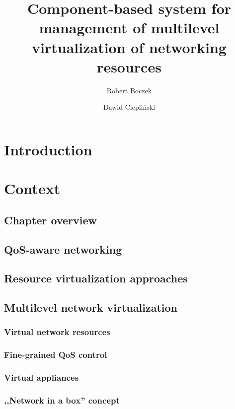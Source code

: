 \documentclass[11pt]{book}
\title{Component-based system for management of multilevel virtualization of networking resources}
\author{Robert Boczek \and Dawid Ciepliński}
\begin{document}
  \maketitle
    
  \tableofcontents
	

  \chapter{Introduction}



  \chapter{Context}  %

    \section{Chapter overview}


    \section{QoS-aware networking}


    \section{Resource virtualization approaches}


    \section{Multilevel network virtualization}

      \subsection{Virtual network resources}

      \subsection{Fine-grained QoS control}

      \subsection{Virtual appliances}

      \subsection{,,Network in a box'' concept}
\end{document}
